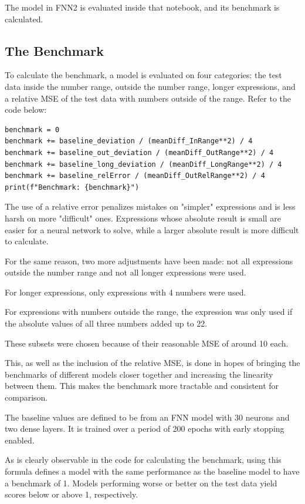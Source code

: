 \documentclass{article}
\begin{document}
The model in FNN2 is evaluated inside that notebook, and its benchmark is calculated.

\subsection{The Benchmark}
To calculate the benchmark, a model is evaluated on four categories: the test data inside the number range, outside the number range, longer expressions, and a relative MSE of the test data with numbers outside of the range. Refer to the code below:
\begin{Verbatim}
benchmark = 0
benchmark += baseline_deviation / (meanDiff_InRange**2) / 4
benchmark += baseline_out_deviation / (meanDiff_OutRange**2) / 4
benchmark += baseline_long_deviation / (meanDiff_LongRange**2) / 4
benchmark += baseline_relError / (meanDiff_OutRelRange**2) / 4
print(f"Benchmark: {benchmark}")
\end{Verbatim}

The use of a relative error penalizes mistakes on "simpler" expressions and is less harsh on more "difficult" ones. Expressions whose absolute result is small are easier for a neural network to solve, while a larger absolute result is more difficult to calculate.

For the same reason, two more adjustments have been made: not all expressions outside the number range and not all longer expressions were used.

For longer expressions, only expressions with 4 numbers were used.

For expressions with numbers outside the range, the expression was only used if the absolute values of all three numbers added up to 22.

These subsets were chosen because of their reasonable MSE of around 10 each.

This, as well as the inclusion of the relative MSE, is done in hopes of bringing the benchmarks of different models closer together and increasing the linearity between them. This makes the benchmark more tractable and consistent for comparison.

The baseline values are defined to be from an FNN model with 30 neurons and two dense layers. It is trained over a period of 200 epochs with early stopping enabled.

As is clearly observable in the code for calculating the benchmark, using this formula defines a model with the same performance as the baseline model to have a benchmark of 1. Models performing worse or better on the test data yield scores below or above 1, respectively.
\end{document}
